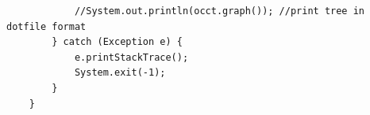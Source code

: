 \documentclass[a4paper,12pt]{article}
\begin{document}
\begin{spacing}{1.5}
\begin{lstlisting}
			//System.out.println(occt.graph()); //print tree in dotfile format
		} catch (Exception e) {
			e.printStackTrace();
			System.exit(-1);
		}
	}
\end{lstlisting}


\restoregeometry
\end{spacing}
\end{document}
